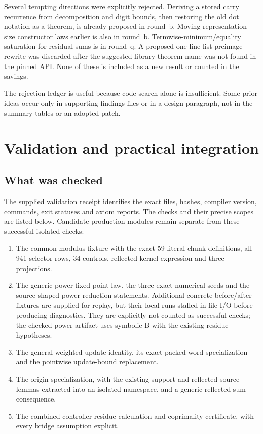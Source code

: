 \documentclass[11pt,letterpaper]{article}
\begin{document}
Several tempting directions were explicitly rejected. Deriving a stored carry recurrence from decomposition and digit bounds, then restoring the old dot notation as a theorem, is already proposed in round~b. Moving representation-size constructor laws earlier is also in round~b. Termwise-minimum/equality saturation for residual sums is in round~q. A proposed one-line list-preimage rewrite was discarded after the suggested library theorem name was not found in the pinned API. None of these is included as a new result or counted in the savings.

The rejection ledger is useful because code search alone is insufficient. Some prior ideas occur only in supporting findings files or in a design paragraph, not in the summary tables or an adopted patch.

\section{Validation and practical integration}

\subsection{What was checked}

The supplied validation receipt identifies the exact files, hashes, compiler version, commands, exit statuses and axiom reports. The checks and their precise scopes are listed below. Candidate production modules remain separate from these successful isolated checks:

\begin{enumerate}
\item The common-modulus fixture with the exact 59 literal chunk definitions, all 941 selector rows, 34 controls, reflected-kernel expression and three projections.
\item The generic power-fixed-point law, the three exact numerical seeds and the source-shaped power-reduction statements. Additional concrete before/after fixtures are supplied for replay, but their local runs stalled in file I/O before producing diagnostics. They are explicitly not counted as successful checks; the checked power artifact uses symbolic B with the existing residue hypotheses.
\item The general weighted-update identity, its exact packed-word specialization and the pointwise update-bound replacement.
\item The origin specialization, with the existing support and reflected-source lemmas extracted into an isolated namespace, and a generic reflected-sum consequence.
\item The combined controller-residue calculation and coprimality certificate, with every bridge assumption explicit.
\end{enumerate}
\end{document}
